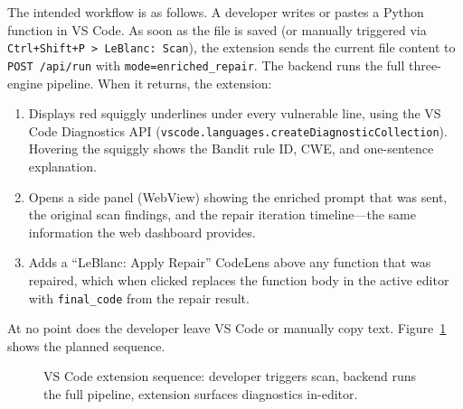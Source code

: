 \documentclass[12pt,a4paper]{report}
\begin{document}
The intended workflow is as follows. A developer writes or pastes a Python
function in VS Code. As soon as the file is saved (or manually triggered via
\texttt{Ctrl+Shift+P > LeBlanc: Scan}), the extension sends the current file
content to \texttt{POST /api/run} with \texttt{mode=enriched\_repair}. The
backend runs the full three-engine pipeline. When it returns, the extension:

\begin{enumerate}
  \item Displays red squiggly underlines under every vulnerable line, using the
        VS Code Diagnostics API (\texttt{vscode.languages.createDiagnosticCollection}).
        Hovering the squiggly shows the Bandit rule ID, CWE, and one-sentence
        explanation.
  \item Opens a side panel (WebView) showing the enriched prompt that was sent,
        the original scan findings, and the repair iteration timeline---the same
        information the web dashboard provides.
  \item Adds a ``LeBlanc: Apply Repair'' CodeLens above any function that was
        repaired, which when clicked replaces the function body in the active
        editor with \texttt{final\_code} from the repair result.
\end{enumerate}

At no point does the developer leave VS Code or manually copy text.
Figure~\ref{fig:vscode_workflow} shows the planned sequence.

\begin{figure}[H]
\centering
{}
\caption{VS Code extension sequence: developer triggers scan, backend runs the
         full pipeline, extension surfaces diagnostics in-editor.}
\label{fig:vscode_workflow}
\end{figure}
\end{document}
